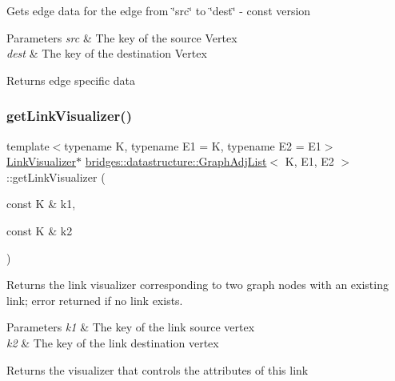 Gets edge data for the edge from \char`\"{}src\char`\"{} to \char`\"{}dest\char`\"{} -\/ const version


\begin{DoxyParams}{Parameters}
{\em src} & The key of the source Vertex \\
\hline
{\em dest} & The key of the destination Vertex\\
\hline
\end{DoxyParams}
\begin{DoxyReturn}{Returns}
edge specific data 
\end{DoxyReturn}
\mbox{\label{classbridges_1_1datastructure_1_1_graph_adj_list_ae36ba10fae403339df0c36707ed13536}} 
\subsubsection{\texorpdfstring{get\+Link\+Visualizer()}{getLinkVisualizer()}}
{\footnotesize\ttfamily template$<$typename K, typename E1 = K, typename E2 = E1$>$ \\
\hyperlink{classbridges_1_1datastructure_1_1_link_visualizer}{Link\+Visualizer}$\ast$ \hyperlink{classbridges_1_1datastructure_1_1_graph_adj_list}{bridges\+::datastructure\+::\+Graph\+Adj\+List}$<$ K, E1, E2 $>$\+::get\+Link\+Visualizer (\begin{DoxyParamCaption}\item[{const K \&}]{k1,  }\item[{const K \&}]{k2 }\end{DoxyParamCaption})\hspace{0.3cm}{\ttfamily [inline]}}

Returns the link visualizer corresponding to two graph nodes with an existing link; error returned if no link exists.


\begin{DoxyParams}{Parameters}
{\em k1} & The key of the link source vertex \\
\hline
{\em k2} & The key of the link destination vertex\\
\hline
\end{DoxyParams}
\begin{DoxyReturn}{Returns}
the visualizer that controls the attributes of this link 
\end{DoxyReturn}
\mbox{\label{classbridges_1_1datastructure_1_1_graph_adj_list_ada58af550495cee2fe454c0be0f8504e}} 
